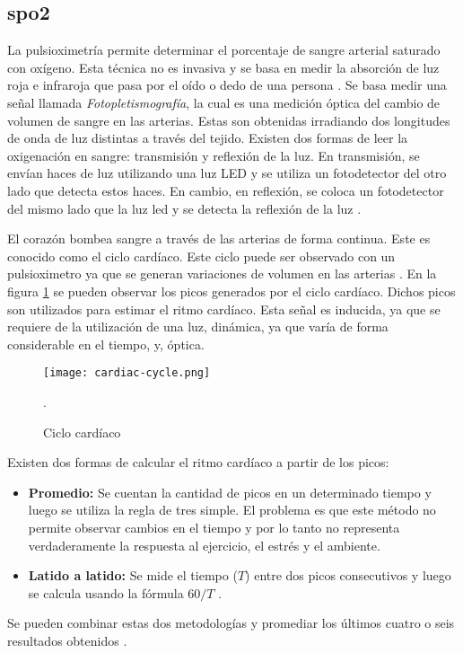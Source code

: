 \subsection{\gls{spo2}}

La pulsioximetría permite determinar el porcentaje de sangre arterial saturado con oxígeno. Esta técnica no es invasiva y se basa en medir la absorción de luz roja e infraroja que pasa por el oído o dedo de una persona \cite{spo2-1}. Se basa medir una señal llamada \emph{Fotopletismografía}, la cual es una medición óptica del cambio de volumen de sangre en las arterias. Estas son obtenidas irradiando dos longitudes de onda de luz distintas a través del tejido. Existen dos formas de leer la oxigenación en sangre: transmisión y reflexión de la luz. En transmisión, se envían haces de luz utilizando una luz LED y se utiliza un fotodetector del otro lado que detecta estos haces. En cambio, en reflexión, se coloca un fotodetector del mismo lado que la luz led y se detecta la reflexión de la luz \cite{spo2-2}.  

El corazón bombea sangre a través de las arterias de forma continua. Este es conocido como el ciclo cardíaco. Este ciclo puede ser observado con un pulsioximetro ya que se generan variaciones de volumen en las arterias \cite{spo2-2}. En la figura \ref{fig:cardiac-cycle} se pueden observar los picos generados por el ciclo cardíaco. Dichos picos son utilizados para estimar el ritmo cardíaco. Esta señal es inducida, ya que se requiere de la utilización de una luz, dinámica, ya que varía de forma considerable en el tiempo, y, óptica.

\begin{figure}[H]
	\centering
    \texttt{[image: cardiac-cycle.png]}
    \caption{Ciclo cardíaco}.
	\label{fig:cardiac-cycle}
\end{figure}

Existen dos formas de calcular el ritmo cardíaco a partir de los picos:

\begin{itemize}
 \item \textbf{Promedio:} Se cuentan la cantidad de picos en un determinado tiempo y luego se utiliza la regla de tres simple. El problema es que este método no permite observar cambios en el tiempo y por lo tanto no representa verdaderamente la respuesta al ejercicio, el estrés y el ambiente.
 \item \textbf{Latido a latido:} Se mide el tiempo ($T$) entre dos picos consecutivos y luego se calcula usando la fórmula $60/T$ \cite{spo2-1}.
\end{itemize}

Se pueden combinar estas dos metodologías y promediar los últimos cuatro o seis resultados obtenidos \cite{spo2-1}.

